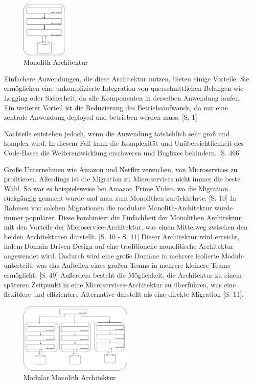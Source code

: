 \documentclass[acmtog]{acmart}
\begin{document}
\begin{figure}[h!]
    \centering
    \includegraphics[width=0.2\textwidth]{images/mono.pdf}
    \caption{Monolith Architektur}
    \label{fig:mono}
\end{figure}

Einfachere Anwendungen, die diese Architektur nutzen, bieten einige Vorteile. 
Sie ermöglichen eine unkomplizierte Integration von querschnittlichen Belangen 
wie Logging oder Sicherheit, da alle Komponenten in derselben Anwendung laufen. 
Ein weiterer Vorteil ist die Reduzierung des Betriebsaufwands, da nur eine 
zentrale Anwendung deployed und betrieben werden muss. \cite{mono2}[S. 1]

Nachteile entstehen jedoch, wenn die Anwendung tatsächlich sehr groß und komplex 
wird. In diesem Fall kann die Komplexität und Unübersichtlichkeit des Code-Bases 
die Weiterentwicklung erschweren und Bugfixes behindern. \cite{mono}[S. 466]

Große Unternehmen wie Amazon und Netflix versuchen, von Microservices 
zu profitieren. Allerdings ist die Migration zu Microservices nicht immer 
die beste Wahl. So war es beispielsweise bei Amazon Prime Video, wo die Migration
rückgängig gemacht wurde und man zum Monolithen zurückkehrte. \cite{modular-mono2}[S. 10]
In Rahmen von solchen Migrationen die modulare Monolith-Architektur wurde immer populärer.
Diese kombiniert die Einfachheit der Monolithen Architektur mit den 
Vorteile der Microservice-Architektur, was einen Mittelweg zwischen 
den beiden Architekturen darstellt. \cite{modular-mono2}[S. 10 - S. 11]
Dieser Architektur wird erreicht, indem Domain-Driven Design auf eine
 traditionelle monolitische Architektur angewendet wird. Dadurch wird eine 
 große Domäne in mehrere isolierte Module unterteilt, was das Aufteilen 
 eines großen Teams in mehrere kleinere Teams ermöglicht. \cite{modular-mono1}[S. 49]
 Außerdem besteht die Möglichkeit, die Architektur zu einem 
späteren Zeitpunkt in eine Microservices-Architektur zu 
überführen, was eine flexiblere und effizientere Alternative darstellt
als eine direkte Migration \cite{modular-mono1}[S. 11].

\begin{figure}[h!]
    \centering
    \includegraphics[width=0.5\textwidth]{images/mono-modular.pdf}
    \caption{Modular Monolith Architektur}
    \label{fig:modular-mono}
\end{figure}
\end{document}
